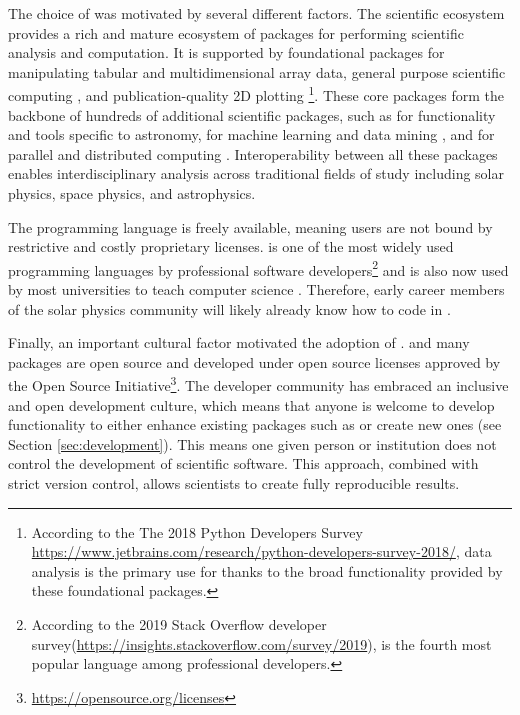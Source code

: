 The choice of \python was motivated by several different factors.
The scientific \python ecosystem provides a rich and mature ecosystem of packages for performing scientific analysis and computation.
It is supported by foundational packages for manipulating tabular \citep[\pandaspkg,][]{pandas} and multidimensional array \citep[\numpypkg,][]{numpy} data, general purpose scientific computing \citep[\scipypkg,][]{scipy}, and publication-quality 2D plotting \citep[\matplotlibpkg,][]{matplotlib}\footnote{According to the The 2018 Python Developers Survey \url{https://www.jetbrains.com/research/python-developers-survey-2018/}, data analysis is the primary use for \python thanks to the broad functionality provided by these foundational packages.}.
These core packages form the backbone of hundreds of additional scientific \python packages, such as \astropypkg for functionality and tools specific to astronomy,  for machine learning and data mining \citep{pedregosa11}, and  for parallel and distributed computing \citep{rocklin15}.
Interoperability between all these packages enables interdisciplinary analysis across traditional fields of study including solar physics, space physics, and astrophysics.

The \python programming language is freely available, meaning users are not bound by restrictive and costly proprietary licenses.
\python is one of the most widely used programming languages by professional software developers\footnote{According to the 2019 Stack Overflow developer survey(\url{https://insights.stackoverflow.com/survey/2019}), \python is the fourth most popular language among professional developers.} and is also now used by most universities to teach computer science \citep{guo2014}.
Therefore, early career members of the solar physics community will likely already know how to code in \python.

Finally, an important cultural factor motivated the adoption of \python.
\python and many \python packages are open source and developed under open source licenses approved by the Open Source Initiative\footnote{\url{https://opensource.org/licenses}}.
The \python developer community has embraced an inclusive and open development culture, which means that anyone is welcome to develop functionality to either enhance existing packages such as \sunpypkg or create new ones (see Section \ref{sec:development}).
This means one given person or institution does not control the development of scientific \python software.
This approach, combined with strict version control, allows scientists to create fully reproducible results.

